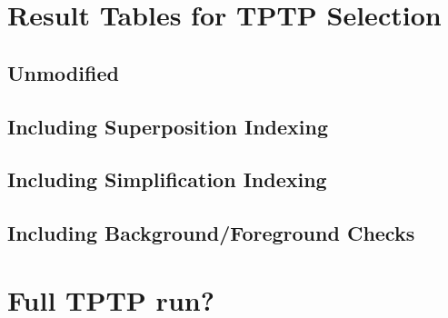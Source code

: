 
\appendix

\chapter{Result Tables for TPTP Selection}
\label{app:app1}

\section{Unmodified \Beagle}

\section{Including Superposition Indexing}

\section{Including Simplification Indexing}

\section{Including Background/Foreground Checks}

\chapter{Full TPTP run?}
\label{app:app2}

